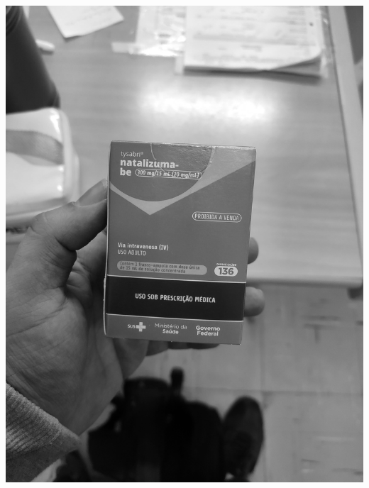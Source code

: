 \begin{frame}
\begin{columns}
\begin{column}{0.24\textwidth}
			\includegraphics[height=0.35\textheight]{../pictures/tysabri_rgb_g_only.jpg}
			\\\vspace{\floatsep}

\end{column}
\end{columns}
\end{frame}
